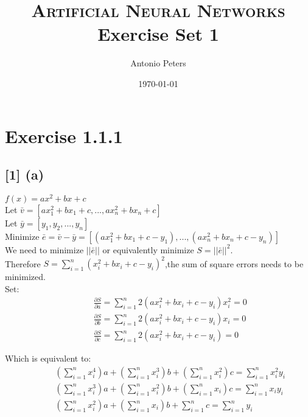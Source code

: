 \documentclass[paper=a4, fontsize=12pt]{article}%
\title{	
\textsc{Artificial Neural Networks} \\ [25pt] %
\huge Exercise Set 1 \\ %
}
\author{Antonio Peters} %
\date{\today} %
\begin{document}
\maketitle %

\section{Exercise 1.1.1}
\subsection{[1] (a)}
$f(x) = ax^2+bx+c$ \\
Let $\bar{v} = [ax_1^2+bx_1+c,...,ax_n^2+bx_n+c]$ \\
Let $\bar{y} = [y_1,y_2,...,y_n]$ \\
Minimize $\bar{e} = \bar{v} - \bar{y} = [(ax_1^2+bx_1+c-y_1),...,(ax_n^2+bx_n+c-y_n)]$ \\
We need to minimize $||\bar{e}||$ or equivalently minimize $S = ||\bar{e}||^2$. \\
Therefore $S = \sum_{i=1}^{n}(x_i^2+bx_i+c-y_i)^2$,the sum of square errors needs to be minimized.\\

Set: \\
\begin{equation}
	\begin{aligned}
		& \qquad \frac{\partial S}{\partial a} = \sum_{i=1}^{n} 2(ax_i^2+bx_i+c-y_i)x_i^2 = 0 \\
		& \qquad \frac{\partial S}{\partial b} = \sum_{i=1}^{n} 2(ax_i^2+bx_i+c-y_i)x_i = 0 \\
		& \qquad \frac{\partial S}{\partial c} = \sum_{i=1}^{n} 2(ax_i^2+bx_i+c-y_i) = 0
	\end{aligned}
\end{equation}

\pagebreak

Which is equivalent to: \\
\begin{equation}
	\begin{aligned}
		& \qquad (\sum_{i=1}^{n}x_i^4)a	+ (\sum_{i=1}^{n}x_i^3)b 	+ (\sum_{i=1}^{n}x_i^2)c = \sum_{i=1}^{n}x_i^2y_i \\
		& \qquad (\sum_{i=1}^{n}x_i^3)a	+ (\sum_{i=1}^{n}x_i^2)b 	+ (\sum_{i=1}^{n}x_i)c = \sum_{i=1}^{n}x_iy_i \\
		& \qquad (\sum_{i=1}^{n}x_i^2)a	+ (\sum_{i=1}^{n}x_i)b 		+ \sum_{i=1}^{n}c = \sum_{i=1}^{n}y_i
	\end{aligned}
\end{equation}
\end{document}
